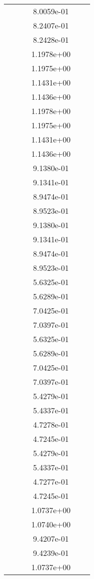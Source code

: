 \begin{xltabular}{\textwidth}{r|rS[table-format=1.3e+2]S[table-format=1.4e+2]S[table-format=1.4e+2]S[table-format=-1.5]}
&  &  & 8.0059e-01 & & \\
&  &  & 8.2407e-01 & & \\
&  &  & 8.2428e-01 & & \\
&  &  & 1.1978e+00 & & \\
&  &  & 1.1975e+00 & & \\
&  &  & 1.1431e+00 & & \\
&  &  & 1.1436e+00 & & \\
&  &  & 1.1978e+00 & & \\
&  &  & 1.1975e+00 & & \\
&  &  & 1.1431e+00 & & \\
&  &  & 1.1436e+00 & & \\
&  &  & 9.1380e-01 & & \\
&  &  & 9.1341e-01 & & \\
&  &  & 8.9474e-01 & & \\
&  &  & 8.9523e-01 & & \\
&  &  & 9.1380e-01 & & \\
&  &  & 9.1341e-01 & & \\
&  &  & 8.9474e-01 & & \\
&  &  & 8.9523e-01 & & \\
&  &  & 5.6325e-01 & & \\
&  &  & 5.6289e-01 & & \\
&  &  & 7.0425e-01 & & \\
&  &  & 7.0397e-01 & & \\
&  &  & 5.6325e-01 & & \\
&  &  & 5.6289e-01 & & \\
&  &  & 7.0425e-01 & & \\
&  &  & 7.0397e-01 & & \\
&  &  & 5.4279e-01 & & \\
&  &  & 5.4337e-01 & & \\
&  &  & 4.7278e-01 & & \\
&  &  & 4.7245e-01 & & \\
&  &  & 5.4279e-01 & & \\
&  &  & 5.4337e-01 & & \\
&  &  & 4.7277e-01 & & \\
&  &  & 4.7245e-01 & & \\
&  &  & 1.0737e+00 & & \\
&  &  & 1.0740e+00 & & \\
&  &  & 9.4207e-01 & & \\
&  &  & 9.4239e-01 & & \\
&  &  & 1.0737e+00 & & \\

\end{xltabular}

